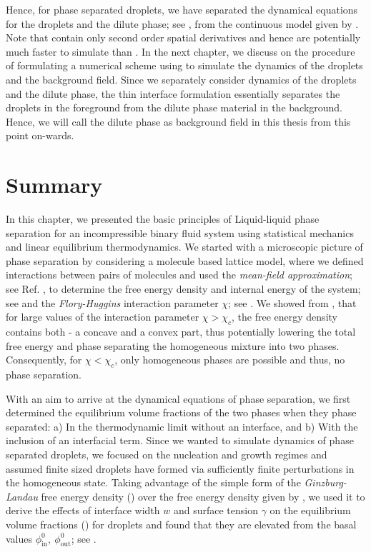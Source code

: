 Hence, for phase separated droplets, we have separated the dynamical equations for the droplets and the dilute phase; see , from the continuous model given by .
Note that  contain only second order spatial derivatives and hence are potentially much faster to simulate than .
In the next chapter, we discuss on the procedure of formulating a numerical scheme using  to simulate the dynamics of the droplets and the background field.
Since we separately consider dynamics of the droplets and the dilute phase, the thin interface formulation essentially separates the droplets in the foreground from the dilute phase material in the background. 
Hence, we will call the dilute phase as background field in this thesis from this point on-wards. 

\section{Summary}

In this chapter, we presented the basic principles of Liquid-liquid phase separation for an incompressible binary fluid system using statistical mechanics and linear equilibrium thermodynamics. 
We started with a microscopic picture of phase separation by considering a molecule based lattice model, where we defined interactions between pairs of molecules and used the \textit{mean-field approximation}; see Ref. \cite{Review2019}, to determine the free energy density and internal energy of the system; see  and the \textit{Flory-Huggins} interaction parameter $\chi$; see .
We showed from , that for large values of the interaction parameter $\chi > \chi_c$, the free energy density contains both - a concave and a convex part, thus potentially lowering the total free energy and phase separating the homogeneous mixture into two phases. 
Consequently, for $\chi < \chi_c$, only homogeneous phases are possible and thus, no phase separation.

With an aim to arrive at the dynamical equations of phase separation, we first determined the equilibrium volume fractions of the two phases when they phase separated: a) In the thermodynamic limit without an interface, and b) With the inclusion of an interfacial term.
Since we wanted to simulate dynamics of phase separated droplets, we 
focused on the nucleation and growth regimes and assumed finite sized droplets have formed via sufficiently finite perturbations in the homogeneous state.
Taking advantage of the simple form of the \textit{Ginzburg-Landau} free energy density () over the free energy density given by , we used it to derive the effects of interface width $w$ and surface tension $\gamma$ on the equilibrium volume fractions () for droplets and found that they are elevated from the basal values $\phi^0_\mathrm{in},~\phi^0_\mathrm{out}$; see .

